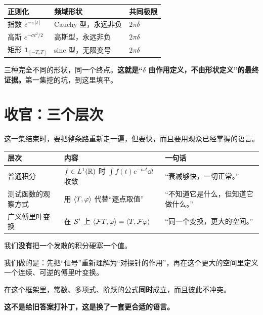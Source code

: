 \begin{ideabox}
\begin{center}
\small
\begin{tabular}{@{}lll@{}}
\toprule
正则化 & 频域形状 & 共同极限 \\
\midrule
指数 $e^{-\varepsilon|t|}$ & Cauchy 型，永远非负 & $2\pi\delta$ \\
高斯 $e^{-\sigma t^{2}/2}$ & 高斯型，永远非负 & $2\pi\delta$ \\
矩形 $\mathbf{1}_{[-T,T]}$ & sinc 型，无限变号 & $2\pi\delta$ \\
\bottomrule
\end{tabular}
\end{center}

三种完全不同的形状，同一个终点。\textbf{这就是“$\delta$ 由作用定义，不由形状定义”的最终证据。}第一集挖的坑，到这里填平。
\end{ideabox}

\section{收官：三个层次}

这一集结束时，要把整条路重新走一遍，但要快，而且要用观众已经掌握的语言。

\begin{center}
\small
\renewcommand{\arraystretch}{1.5}
\begin{tabularx}{\textwidth}{@{}L{3.2cm}L{5.0cm}Y@{}}
\toprule
层次 & 内容 & 一句话 \\
\midrule
普通积分 & $f\in L^1(\mathbb{R})$ 时 $\displaystyle\int f(t)e^{-i\omega t}\dd t$ 收敛 & “衰减够快，一切正常。”\\
测试函数的观察方式 & 用 $\langle T,\varphi\rangle$ 代替“逐点取值” & “不知道它是什么，但知道它做什么。”\\
广义傅里叶变换 & 在 $\mathcal{S}'$ 上 $\langle \mathcal{F} T,\varphi\rangle=\langle T,\mathcal{F}\varphi\rangle$ & “同一个变换，更大的空间。”\\
\bottomrule
\end{tabularx}
\end{center}

\begin{ideabox}[最后要说的一句话]
我们\textbf{没有}把一个发散的积分硬塞一个值。

我们做的是：先把“信号”重新理解为“对探针的作用”，再在这个更大的空间里定义一个连续、可逆的傅里叶变换。

在这个框架里，常数、多项式、阶跃的公式\textbf{同时}成立，而且彼此不冲突。

\textbf{这不是给旧答案打补丁，这是换了一套更合适的语言。}
\end{ideabox}

